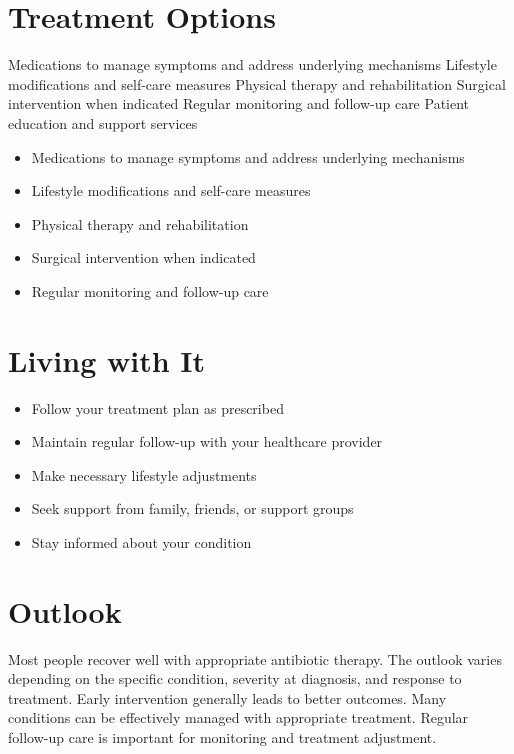 \section{Treatment Options}
Medications to manage symptoms and address underlying mechanisms Lifestyle modifications and self-care measures Physical therapy and rehabilitation Surgical intervention when indicated Regular monitoring and follow-up care Patient education and support services

\begin{itemize}[noitemsep]
  \item Medications to manage symptoms and address underlying mechanisms
  \item Lifestyle modifications and self-care measures
  \item Physical therapy and rehabilitation
  \item Surgical intervention when indicated
  \item Regular monitoring and follow-up care
\end{itemize}
\section{Living with It}
\begin{itemize}[noitemsep]
  \item Follow your treatment plan as prescribed
  \item Maintain regular follow-up with your healthcare provider
  \item Make necessary lifestyle adjustments
  \item Seek support from family, friends, or support groups
  \item Stay informed about your condition
\end{itemize}
\section{Outlook}
Most people recover well with appropriate antibiotic therapy. The outlook varies depending on the specific condition, severity at diagnosis, and response to treatment. Early intervention generally leads to better outcomes. Many conditions can be effectively managed with appropriate treatment. Regular follow-up care is important for monitoring and treatment adjustment.
